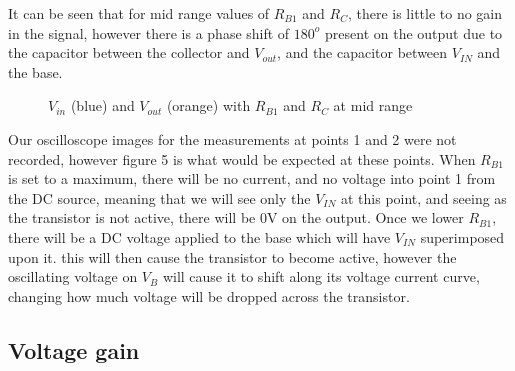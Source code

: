 \documentclass[a4paper,11pt]{article}
\begin{document}
It can be seen that for mid range values of  $R_{B1}$ and $R_C$, there is little to no gain in the signal, however there is a phase shift of $180^o$ present on the output due to the capacitor between the collector and $V_{out}$, and the capacitor between $V_{IN}$ and the base.

\begin{figure}[h]
  \vspace{-5pt}
 \begin{center}
  \vspace{-24pt}
  \caption{$V_{in}$ (blue) and $V_{out}$ (orange) with $R_{B1}$ and $R_C$ at mid range}
 \end{center}
\end{figure}

Our oscilloscope images for the measurements at points 1 and 2 were not recorded, however figure 5 is what would be expected at these points. When $R_{B1}$ is set to a maximum, there will be no current, and no voltage into point 1 from the DC source, meaning that we will see only the $V_{IN}$ at this point, and seeing as the transistor is not active, there will be 0V on the output. Once we lower $R_{B1}$, there will be a DC voltage applied to the base which will have $V_{IN}$ superimposed upon it. this will then cause the transistor to become active, however the oscillating voltage on $V_B$ will cause it to shift along its voltage current curve, changing how much voltage will be dropped across the transistor. 

\subsection{Voltage gain}
\end{document}
